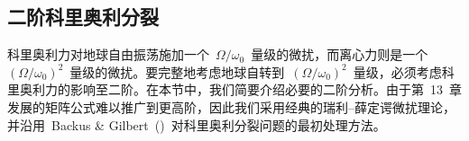 \renewcommand{\thesubsection}{$\!\!\!\raise1.3ex\hbox{$\star$}\!\!$
\arabic{chapter}.\arabic{section}.\arabic{subsection}}
\subsection{二阶科里奥利分裂}
%
%
\renewcommand{\thesubsection}{\arabic{chapter}.\arabic{section}.\arabic{subsection}}
\label{section:10.second-orderCoriolis}

科里奥利力对地球自由振荡施加一个~$\Omega/\omega_0$~量级的微扰，而离心力则是一个~$(\Omega/\omega_0)^2$~量级的微扰。要完整地考虑地球自转到~$(\Omega/\omega_0)^2$~量级，必须考虑科里奥利力的影响至二阶。在本节中，我们简要介绍必要的二阶分析。由于第~13~章发展的矩阵公式难以推广到更高阶，因此我们采用经典的瑞利--薛定谔微扰理论，并沿用~Backus \& Gilbert~(\citeyear{backus&gilbert61})~对科里奥利分裂问题的最初处理方法。

